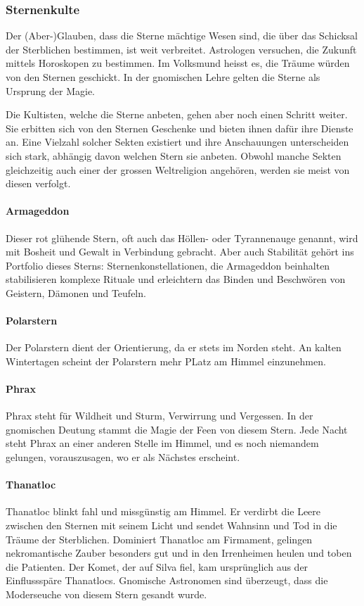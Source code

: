 \documentclass[12pt,twoside,twocolumn,openany]{book}
\begin{document}
	
	\subsubsection{Sternenkulte}
	Der (Aber-)Glauben, dass die Sterne mächtige Wesen sind, die über das Schicksal der Sterblichen bestimmen, ist weit verbreitet. Astrologen versuchen, die Zukunft mittels Horoskopen zu bestimmen. Im Volksmund heisst es, die Träume würden von den Sternen geschickt.
	In der gnomischen Lehre gelten die Sterne als Ursprung der Magie.
	
	Die Kultisten, welche die Sterne anbeten, gehen aber noch einen Schritt weiter. Sie erbitten sich von den Sternen Geschenke und bieten ihnen dafür ihre Dienste an. Eine Vielzahl solcher Sekten existiert und ihre Anschauungen unterscheiden sich stark, abhängig davon welchen Stern sie anbeten. Obwohl manche Sekten gleichzeitig auch einer der grossen Weltreligion angehören, werden sie meist von diesen verfolgt.
	
	\paragraph{Armageddon}
	Dieser rot glühende Stern, oft auch das Höllen- oder Tyrannenauge genannt, wird mit Bosheit und Gewalt in Verbindung gebracht. Aber auch Stabilität gehört ins Portfolio dieses Sterns: Sternenkonstellationen, die Armageddon beinhalten stabilisieren komplexe Rituale und erleichtern das Binden und Beschwören von Geistern, Dämonen und Teufeln.
	
	\paragraph{Polarstern}
	Der Polarstern dient der Orientierung, da er stets im Norden steht. An kalten Wintertagen scheint der Polarstern mehr PLatz am Himmel einzunehmen. 
	
	\paragraph{Phrax}
	Phrax steht für Wildheit und Sturm, Verwirrung und Vergessen. In der gnomischen Deutung stammt die Magie der Feen von diesem Stern. Jede Nacht steht Phrax an einer anderen Stelle im Himmel, und es noch niemandem gelungen, vorauszusagen, wo er als Nächstes erscheint.
	
	\paragraph{Thanatloc}
	Thanatloc blinkt fahl und missgünstig am Himmel. Er verdirbt die Leere zwischen den Sternen mit seinem Licht und sendet Wahnsinn und Tod in die Träume der Sterblichen. Dominiert Thanatloc am Firmament, gelingen nekromantische Zauber besonders gut und in den Irrenheimen heulen und toben die Patienten. Der Komet, der auf Silva fiel, kam ursprünglich aus der Einflussspäre Thanatlocs. Gnomische Astronomen sind überzeugt, dass die Moderseuche von diesem Stern gesandt wurde.
\end{document}
